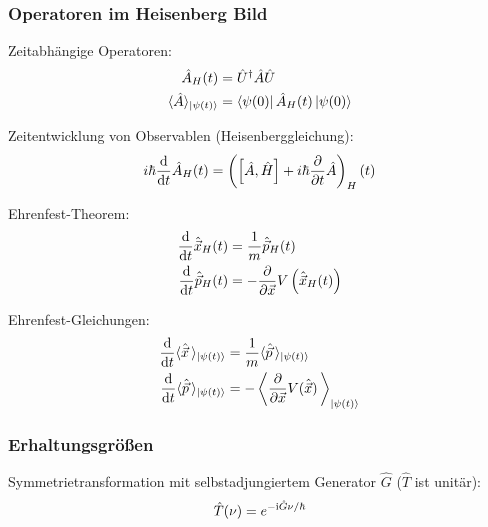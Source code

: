 		\subsubsection{Operatoren im Heisenberg Bild}
			\noindent
			Zeitabhängige Operatoren:
			\begin{equation}
				\begin{aligned}
					\hat{A}_H(t) &= \hat{U}^\dagger \hat{A} \hat{U} \\
					\langle \hat{A} \rangle_{\Ket{\psi(t)}} &= \Bra{\psi(0)}\hat{A}_H(t)\Ket{\psi(0)}
				\end{aligned}
			\end{equation}

			\noindent
			Zeitentwicklung von Observablen (Heisenberggleichung):
			\begin{equation}
				i\hbar \frac{\mathrm{d} }{\mathrm{d} t} \hat{A}_H(t) = \left(\left[\hat{A}, \hat{H}\right] + i\hbar \frac{\partial }{\partial t} \hat{A}\right)_H (t)
			\end{equation}

			\noindent
			Ehrenfest-Theorem:
			\begin{equation}
				\begin{aligned}
					\frac{\mathrm{d} }{\mathrm{d} t} \hat{\vec{x}}_H(t) &= \frac{1}{m}\hat{\vec{p}}_H(t) \\
					\frac{\mathrm{d} }{\mathrm{d} t} \hat{\vec{p}}_H(t) &= - \frac{\partial }{\partial \vec{x}} V \left(\hat{\vec{x}}_H(t)\right) \\
				\end{aligned}
			\end{equation}

			\noindent
			Ehrenfest-Gleichungen:
			\begin{equation}
				\begin{aligned}
					\frac{\mathrm{d} }{\mathrm{d} t} \langle \hat{\vec{x}} \,\rangle_{\Ket{\psi(t)}} &= \frac{1}{m} \langle \hat{\vec{p}} \,\rangle_{\Ket{\psi(t)}} \\
					\frac{\mathrm{d} }{\mathrm{d} t} \langle \hat{\vec{p}} \,\rangle_{\Ket{\psi(t)}} &= - \left\langle \frac{\partial }{\partial \vec{x}} V(\hat{\vec{x}}) \,\right\rangle_{\Ket{\psi(t)}} \\
				\end{aligned}
			\end{equation}

		\subsubsection{Erhaltungsgrößen}
			\noindent
			Symmetrietransformation mit selbstadjungiertem Generator $\hat{G}$ ($\hat{T}$ ist unitär):
			\begin{equation}
				\hat{T}(\nu) = e^{-\mathrm{i}\hat{G}\nu/\hbar}
			\end{equation}

